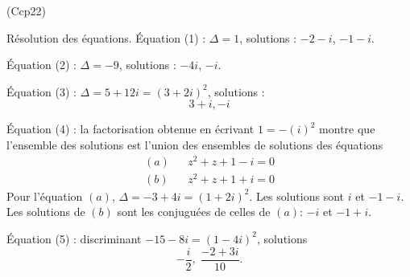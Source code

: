 \begin{tiny}(Ccp22)\end{tiny} Résolution des équations.\newline
\'Equation (1) : $\Delta = 1$,  solutions :  $-2-i$, $-1-i$.

\'Equation (2) : $\Delta = -9$, solutions : $-4i$, $-i$.

\'Equation (3) : $\Delta = 5+12i=(3+2i)^2$, solutions :
\begin{displaymath}
  3+i, -i
\end{displaymath}

\'Equation (4) : la factorisation obtenue en écrivant $1 = -(i)^2$ montre que l'ensemble des solutions est l'union des ensembles de solutions des équations
\begin{align*}
  (a)&& z^2+z+1-i = 0 \\   (b)&& z^2+z+1+i = 0 
\end{align*}
Pour l'équation $(a)$, $\Delta = -3+4i = (1+2i)^2$. Les solutions sont $i$ et $-1-i$.\newline
Les solutions de $(b)$ sont les conjuguées de celles de $(a)$: $-i$ et $-1+i$.

\'Equation (5) : discriminant $-15-8i = (1-4i)^2$, solutions
\[
 -\frac{i}{2},\; \frac{-2 + 3i}{10}.
\]

